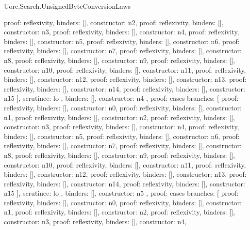 \begin{lexlean}{Uorc.Search.UnsignedByteConversionLaws}
\begin{semanticmodule}
{{{{            {proof: reflexivity{}, binders: [], constructor: n2},
            {proof: reflexivity{}, binders: [], constructor: n3},
            {proof: reflexivity{}, binders: [], constructor: n4},
            {proof: reflexivity{}, binders: [], constructor: n5},
            {proof: reflexivity{}, binders: [], constructor: n6},
            {proof: reflexivity{}, binders: [], constructor: n7},
            {proof: reflexivity{}, binders: [], constructor: n8},
            {proof: reflexivity{}, binders: [], constructor: n9},
            {proof: reflexivity{}, binders: [], constructor: n10},
            {proof: reflexivity{}, binders: [], constructor: n11},
            {proof: reflexivity{}, binders: [], constructor: n12},
            {proof: reflexivity{}, binders: [], constructor: n13},
            {proof: reflexivity{}, binders: [], constructor: n14},
            {proof: reflexivity{}, binders: [], constructor: n15}
          ],
          scrutinee: lo
        },
        binders: [],
        constructor: n4
      },
      {
        proof: cases{
          branches: [
            {proof: reflexivity{}, binders: [], constructor: n0},
            {proof: reflexivity{}, binders: [], constructor: n1},
            {proof: reflexivity{}, binders: [], constructor: n2},
            {proof: reflexivity{}, binders: [], constructor: n3},
            {proof: reflexivity{}, binders: [], constructor: n4},
            {proof: reflexivity{}, binders: [], constructor: n5},
            {proof: reflexivity{}, binders: [], constructor: n6},
            {proof: reflexivity{}, binders: [], constructor: n7},
            {proof: reflexivity{}, binders: [], constructor: n8},
            {proof: reflexivity{}, binders: [], constructor: n9},
            {proof: reflexivity{}, binders: [], constructor: n10},
            {proof: reflexivity{}, binders: [], constructor: n11},
            {proof: reflexivity{}, binders: [], constructor: n12},
            {proof: reflexivity{}, binders: [], constructor: n13},
            {proof: reflexivity{}, binders: [], constructor: n14},
            {proof: reflexivity{}, binders: [], constructor: n15}
          ],
          scrutinee: lo
        },
        binders: [],
        constructor: n5
      },
      {
        proof: cases{
          branches: [
            {proof: reflexivity{}, binders: [], constructor: n0},
            {proof: reflexivity{}, binders: [], constructor: n1},
            {proof: reflexivity{}, binders: [], constructor: n2},
            {proof: reflexivity{}, binders: [], constructor: n3},
            {proof: reflexivity{}, binders: [], constructor: n4},
}}}}
\end{semanticmodule}
\end{lexlean}
